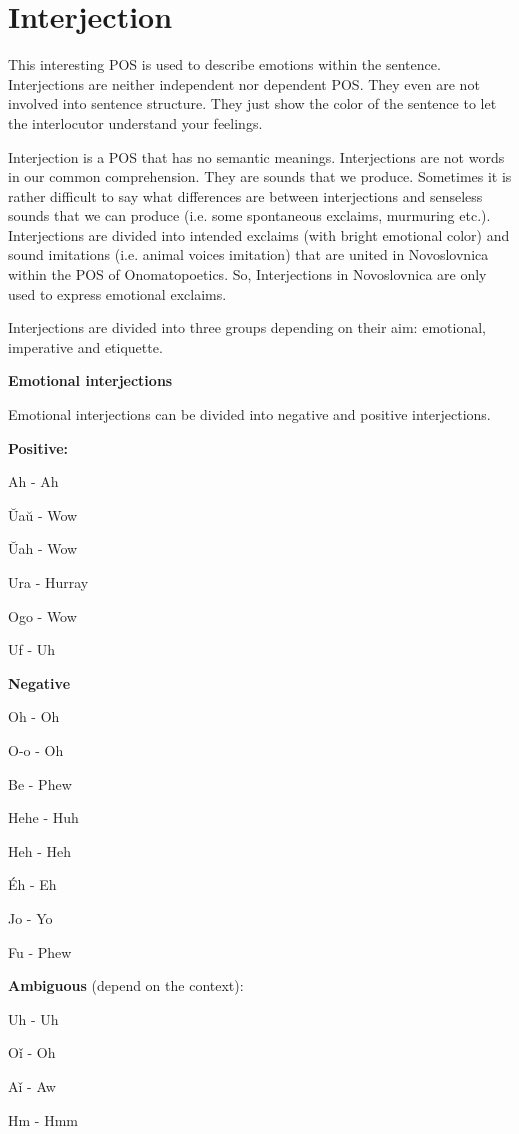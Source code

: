 \section{Interjection}

This interesting POS is used to describe emotions within the sentence. Interjections are neither independent nor dependent POS. They even are not involved into sentence structure. They just show the color of the sentence to let the interlocutor understand your feelings. 

Interjection is a POS that has no semantic meanings. Interjections are not words in our common comprehension. They are sounds that we produce. Sometimes it is rather difficult to say what differences are between interjections and senseless sounds that we can produce (i.e. some spontaneous exclaims, murmuring etc.). Interjections are divided into intended exclaims (with bright emotional color) and sound imitations (i.e. animal voices imitation) that are united in Novoslovnica within the POS of Onomatopoetics. So, Interjections in Novoslovnica are only used to express emotional exclaims.

Interjections are divided into three groups depending on their aim: emotional, imperative and etiquette. 

\textbf{Emotional interjections}

Emotional interjections can be divided into negative and positive interjections.

\textbf{Positive:}

Ah - Ah

Ŭaŭ - Wow

Ŭah - Wow

Ura - Hurray

Ogo - Wow

Uf - Uh

\textbf{Negative}

Oh - Oh

O-o - Oh

Be - Phew

Hehe - Huh

Heh - Heh

Éh - Eh

Jo - Yo

Fu - Phew

\textbf{Ambiguous} (depend on the context):

Uh - Uh

Oǐ - Oh

Aǐ - Aw

Hm - Hmm

